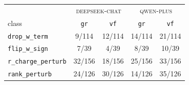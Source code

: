 \begin{tabular}{lcccc}
\toprule
 & \multicolumn{2}{c}{\textsc{deepseek-chat}} & \multicolumn{2}{c}{\textsc{qwen-plus}} \\
class & \texttt{gr} & \texttt{vf} & \texttt{gr} & \texttt{vf} \\
\midrule
\texttt{drop\_w\_term} & 9/114 & 12/114 & 14/114 & 21/114 \\
\texttt{flip\_w\_sign} & 7/39 & 4/39 & 8/39 & 10/39 \\
\texttt{r\_charge\_perturb} & 32/156 & 18/156 & 25/156 & 33/156 \\
\texttt{rank\_perturb} & 24/126 & 30/126 & 14/126 & 35/126 \\
\bottomrule
\end{tabular}
